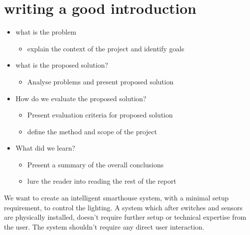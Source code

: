 \section{writing a good introduction}
\label{writingagoodintroduction}

\begin{itemize}
\item what is the problem

\begin{itemize}
\item explain the context of the project and identify goals

\end{itemize}

\item what is the proposed solution?

\begin{itemize}
\item Analyse problems and present proposed solution

\end{itemize}

\item How do we evaluate the proposed solution?

\begin{itemize}
\item Present evaluation criteria for proposed solution

\item define the method and scope of the project

\end{itemize}

\item What did we learn?

\begin{itemize}
\item Present a summary of the overall conclusions

\item lure the reader into reading the rest of the report

\end{itemize}

\end{itemize}

We want to create an intelligent smarthouse system, with a minimal setup requirement, to control the lighting. A system which after switches and sensors are physically installed, doesn't require further setup or technical expertise from the user. The system shouldn't require any direct user interaction.

